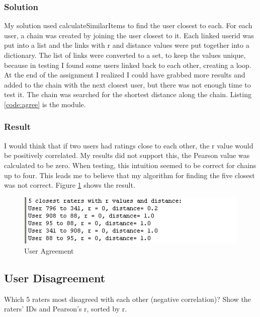 \documentclass[paper=a4, fontsize=11pt]{scrartcl} %
\numberwithin{equation}{section} %
\numberwithin{figure}{section} %
\numberwithin{table}{section} %
\begin{document}
\subsubsection{Solution}
My solution used calculateSimilarItems to find the user closest to each.
For each user, a chain was created by joining the user closest to it.
Each linked userid was put into a list and the links with r and distance values were put together into a dictionary.
The list of links were converted to a set, to keep the values unique, because in testing I found some users linked back to each other, creating a loop.
At the end of the assignment I realized I could have grabbed more results and added to the chain with the next closest user, but there was not enough time to test it.
The chain was searched for the shortest distance along the chain.
Listing \ref{code:agree} is the module.\\



\subsubsection{Result}
I would think that if two users had ratings close to each other, the r value would be positively correlated.
My results did not support this, the Pearson value was calculated to be zero.
When testing, this intuition seemed to be correct for chains up to four.
This leads me to believe that my algorithm for finding the five closest was not correct.
Figure \ref{fig:agree} shows the result.

\begin{figure}[H]
\includegraphics[width=1\textwidth]{pics/agree}
\caption{User Agreement}
\label{fig:agree}
\end{figure}

\subsection{User Disagreement}
Which 5 raters most disagreed with each other (negative correlation)? 
Show the raters' IDs and Pearson's r, sorted by r.
\end{document}
